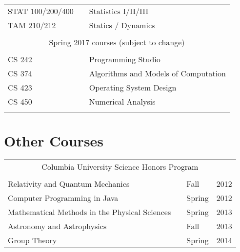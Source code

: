 \documentclass[10pt,letterpaper,sans]{moderncv}
\begin{document}
\begin{tabular}{l p{1in} l}
  STAT 100/200/400 & \hfill & Statistics I/II/III                   \\
  TAM 210/212      & \hfill & Statics / Dynamics                    \\
  \\
  \multicolumn{3}{c}{Spring 2017 courses (subject to change)} \\
  \\[3pt]
  CS 242           & \hfill & Programming Studio                    \\
  CS 374           & \hfill & Algorithms and Models of Computation  \\
  CS 423           & \hfill & Operating System Design               \\
  CS 450           & \hfill & Numerical Analysis                    \\
  \\
\end{tabular}

\section{Other Courses}
\setlength{\tabcolsep}{10pt}
\begin{tabular}{l p{0.6in} l l}
  \\
  \multicolumn{4}{c}{Columbia University Science Honors Program} \\
  \\
  Relativity and Quantum Mechanics              & \hfill & Fall   & 2012 \\
  Computer Programming in Java                  & \hfill & Spring & 2012 \\
  Mathematical Methods in the Physical Sciences & \hfill & Spring & 2013 \\
  Astronomy and Astrophysics                    & \hfill & Fall   & 2013 \\
  Group Theory                                  & \hfill & Spring & 2014 \\
\end{tabular}
\end{document}

